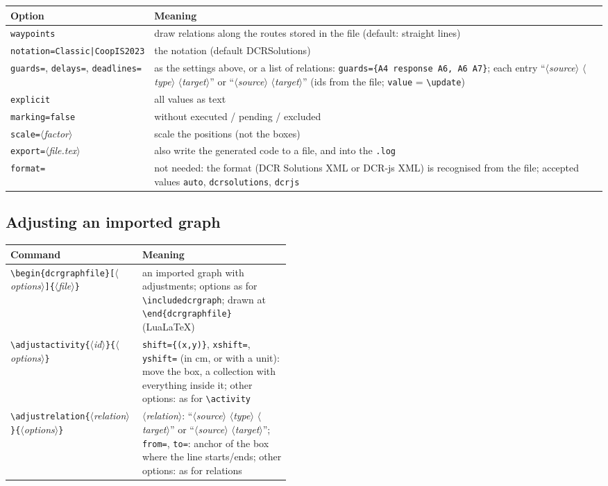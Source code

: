 \documentclass[a4paper,11pt]{article}
\newcommand\cs[1]{\texttt{\textbackslash#1}}
\newcommand\key[1]{\texttt{#1}}
\newcommand\meta[1]{\ensuremath{\langle}\textit{#1}\ensuremath{\rangle}}
\newcommand\marg[1]{\texttt{\{}\meta{#1}\texttt{\}}}
\newcommand\oarg[1]{\texttt{[}\meta{#1}\texttt{]}}
\begin{document}
\medskip
\begin{tabularx}{\linewidth}{@{}lL@{}}
\toprule
Option & Meaning\\
\midrule
\key{waypoints} & draw relations along the routes stored in the file
  (default: straight lines)\\
\key{notation=Classic|CoopIS2023} & the notation (default DCRSolutions)\\
\key{guards=}, \key{delays=}, \key{deadlines=} & as the settings above, or a list of
  relations: \key{guards=\{A4 response A6, A6 A7\}}; each entry
  ``\meta{source} \meta{type} \meta{target}'' or ``\meta{source} \meta{target}''
  (ids from the file; \key{value} = \cs{update})\\
\key{explicit} & all values as text\\
\key{marking=false} & without executed / pending / excluded\\
\key{scale=}\meta{factor} & scale the positions (not the boxes)\\
\key{export=}\meta{file.tex} & also write the generated code to a file, and
  into the \texttt{.log}\\
\key{format=} & not needed: the format (DCR Solutions XML or DCR-js XML) is
  recognised from the file; accepted values \key{auto}, \key{dcrsolutions},
  \key{dcrjs}\\
\bottomrule
\end{tabularx}

\subsection{Adjusting an imported graph}
\begin{tabularx}{\linewidth}{@{}>{\raggedright\arraybackslash}p{0.47\linewidth}L@{}}
\toprule
Command & Meaning\\
\midrule
\cs{begin\{dcrgraphfile\}}\oarg{options}\marg{file} & an imported graph with
  adjustments; options as for \cs{includedcrgraph}; drawn at
  \cs{end\{dcrgraphfile\}} (Lua\LaTeX)\\
\cs{adjustactivity}\marg{id}\marg{options} & \key{shift=\{(x,y)\}},
  \key{xshift=}, \key{yshift=} (in cm, or with a unit): move the box, a
  collection with everything inside it; other options: as for \cs{activity}\\
\cs{adjustrelation}\marg{relation}\marg{options} & \meta{relation}:
  ``\meta{source} \meta{type} \meta{target}'' or ``\meta{source} \meta{target}'';
  \key{from=}, \key{to=}: anchor of the box where the line starts/ends;
  other options: as for relations\\
\bottomrule
\end{tabularx}
\end{document}
